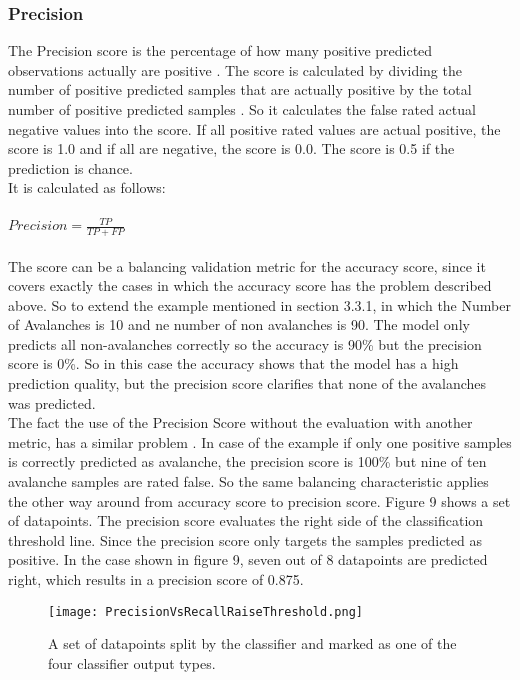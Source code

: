 \documentclass[../masterarbeit.tex]{subfiles}
\begin{document}
\subsubsection{Precision}
The Precision score is the percentage of how many positive predicted observations actually are positive \textcite[]{Kartik_evaluation:2022}. The score is calculated by dividing the number of positive predicted samples that are actually positive by the total number of positive predicted samples \textcite[]{Kartik_evaluation:2022}. So it calculates the false rated actual negative values into the score. If all positive rated values are actual positive, the score is 1.0 and if all are negative, the score is 0.0. The score is 0.5 if the prediction is chance.\\
It is calculated as follows:
\\~\\
\(Precision = \frac{TP}{TP + FP} \) \hfill \textcite[]{Kartik_evaluation:2022} \\~\\
The score can be a balancing validation metric for the accuracy score, since it covers exactly the cases in which the accuracy score has the problem described above. So to extend the example mentioned in section 3.3.1, in which the Number of Avalanches is 10 and ne number of non avalanches is 90. The model only predicts all non-avalanches correctly so the accuracy is 90\% but the precision score is 0\%. So in this case the accuracy shows that the model has a high prediction quality, but the precision score clarifies that none of the avalanches was predicted.\\
The fact the use of the Precision Score without the evaluation with another metric, has a similar problem \autocite[]{Google_Precision_Recall:2022}. In case of the example if only one positive samples is correctly predicted as avalanche, the precision score is 100\% but nine of ten avalanche samples are rated false. So the same balancing characteristic applies the other way around from accuracy score to precision score. Figure 9 shows a set of datapoints. The precision score evaluates the right side of the classification threshold line. Since the precision score only targets the samples predicted as positive. In the case shown in figure 9, seven out of 8 datapoints are predicted right, which results in a precision score of 0.875.



\begin{figure}[h]
    \centering
    \texttt{[image: PrecisionVsRecallRaiseThreshold.png]}
    \caption{A set of datapoints split by the classifier and marked as one of the four classifier output types.}
\end{figure} 
\end{document}
